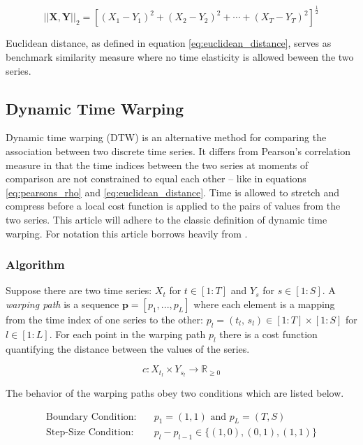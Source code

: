 \documentclass[12pt]{article}
\begin{document}
\begin{equation} \label{eq:euclidean_distance}
    ||\boldsymbol{X}, \boldsymbol{Y}||_{2} = \left[ (X_{1} - Y_{1})^{2} + (X_{2} - Y_{2})^{2} + \cdots + (X_{T} - Y_{T})^{2} \right]^{\frac{1}{2}}
\end{equation}

Euclidean distance, as defined in equation \ref{eq:euclidean_distance}, serves as benchmark similarity measure where no time elasticity is allowed beween the two series.

\subsection{Dynamic Time Warping} \label{sec:DTW}

Dynamic time warping (DTW) is an alternative method for comparing the association between two discrete time series. It differs from Pearson's correlation measure in that the time indices between the two series at moments of comparison are not constrained to equal each other -- like in equations \ref{eq:pearsons_rho} and \ref{eq:euclidean_distance}. Time is allowed to stretch and compress before a local cost function is applied to the pairs of values from the two series. This article will adhere to the classic definition of dynamic time warping. For notation this article borrows heavily from \cite{Mueller2007}.

\subsubsection{Algorithm} \label{sec:DTW_Algorithm}

Suppose there are two time series: $X_{t}$ for $t \in [1:T]$ and $Y_{s}$ for $s \in [1:S]$. A \emph{warping path} is a sequence $\boldsymbol{p} = [p_{1},..., p_{L}]$ where each element is a mapping from the time index of one series to the other: $p_{l} = (t_{l}, \, s_{l}) \in [1:T] \times [1:S]$ for $l \in [1:L]$. For each point in the warping path $p_{l}$ there is a cost function quantifying the distance between the values of the series.

\begin{equation} \label{eq:local_cost_function}
    c: X_{t_{l}} \times Y_{s_{l}} \rightarrow \mathbb{R}_{\ge 0}
\end{equation}

The behavior of the warping paths obey two conditions which are listed below.

\begin{align}
    \text{Boundary Condition:} \quad & p_{1} = (1, 1) \text{ and } p_{L} = (T, S) \\ 
    \text{Step-Size Condition:} \quad& p_{l} - p_{l - 1} \in \{ (1, 0), (0, 1), (1, 1) \} \label{eq:dtw_condition}
\end{align}
\end{document}
